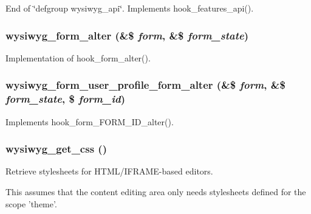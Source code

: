 \label{wysiwyg_8module_a50b7a796362c1595678743fc3d4307d7}
End of \char`\"{}defgroup wysiwyg\_\-api\char`\"{}. Implements hook\_\-features\_\-api(). \hypertarget{wysiwyg_8module_a452faad91d7d0855861a5a36739013a7}{
\subsubsection[{wysiwyg\_\-form\_\-alter}]{\setlength{\rightskip}{0pt plus 5cm}wysiwyg\_\-form\_\-alter (\&\$ {\em form}, \/  \&\$ {\em form\_\-state})}}
\label{wysiwyg_8module_a452faad91d7d0855861a5a36739013a7}
Implementation of hook\_\-form\_\-alter(). \hypertarget{wysiwyg_8module_a39cf10beffe3a191736440a4787e89c0}{
\subsubsection[{wysiwyg\_\-form\_\-user\_\-profile\_\-form\_\-alter}]{\setlength{\rightskip}{0pt plus 5cm}wysiwyg\_\-form\_\-user\_\-profile\_\-form\_\-alter (\&\$ {\em form}, \/  \&\$ {\em form\_\-state}, \/  \$ {\em form\_\-id})}}
\label{wysiwyg_8module_a39cf10beffe3a191736440a4787e89c0}
Implements hook\_\-form\_\-FORM\_\-ID\_\-alter(). \hypertarget{wysiwyg_8module_a372ab7c51cdabba4b7bf9b01d5522136}{
\subsubsection[{wysiwyg\_\-get\_\-css}]{\setlength{\rightskip}{0pt plus 5cm}wysiwyg\_\-get\_\-css ()}}
\label{wysiwyg_8module_a372ab7c51cdabba4b7bf9b01d5522136}
Retrieve stylesheets for HTML/IFRAME-\/based editors.

This assumes that the content editing area only needs stylesheets defined for the scope 'theme'.

